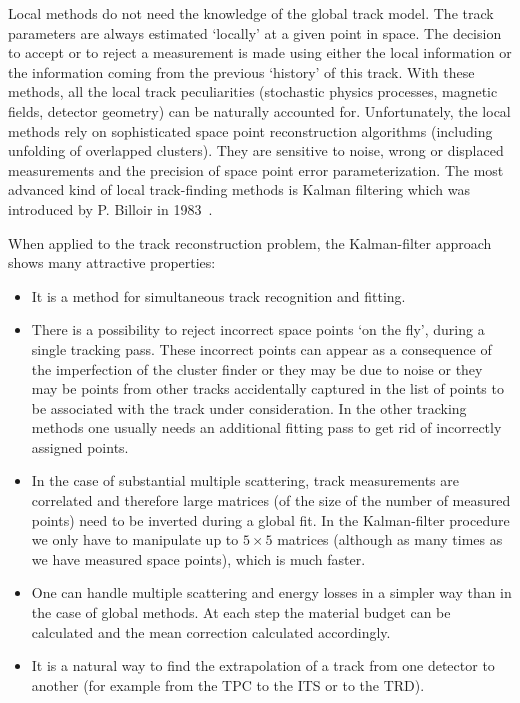 \documentclass[12pt,a4paper,twoside]{article}
\begin{document}
Local methods do not need the knowledge of the global track model.
The track parameters are always estimated `locally' at a given point
in space.  The decision to accept or to reject a measurement is made using
either the local information or the information coming from the previous
`history' of this track.  With these methods, all the local track
peculiarities (stochastic physics processes, magnetic fields, detector
geometry) can be naturally accounted for.  Unfortunately, the local methods
rely on sophisticated space point reconstruction algorithms (including 
unfolding of overlapped clusters). They are sensitive to noise, wrong or
displaced measurements and the precision of space point error parameterization.
The most advanced kind of local track-finding methods is Kalman
filtering which was introduced by P. Billoir in 1983~\cite{MC:billoir}.



When applied to the track reconstruction problem, the Kalman-filter
approach shows many attractive properties:
\begin{itemize}

\item It is a method for simultaneous track recognition and
  fitting.

\item There is a possibility to reject incorrect space points `on
  the fly', during a single tracking pass. These incorrect points can
  appear as a consequence of the imperfection of the cluster finder or
  they may be due to noise or they may be points from other tracks
  accidentally captured in the list of points to be associated with
  the track under consideration. In the other tracking methods one
  usually needs an additional fitting pass to get rid of incorrectly
  assigned points.

\item In the case of substantial multiple scattering, track
  measurements are correlated and therefore large matrices (of the
  size of the number of measured points) need to be inverted during
  a global fit. In the Kalman-filter procedure we only have to
  manipulate up to $5 \times 5$ matrices (although as many times as
  we have measured space points), which is much faster.

\item One can handle multiple scattering and
  energy losses in a simpler way than in the case of global
  methods. At each step the material budget can be calculated and the
  mean correction calculated accordingly.

\item It is a natural way to find the extrapolation
  of a track from one detector to another (for example from the TPC
  to the ITS or to the TRD).
\end{itemize}
\end{document}
